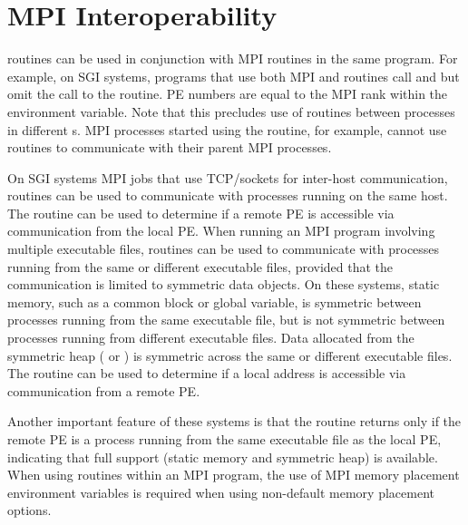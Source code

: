 \section{\ac{MPI} Interoperability}
\begin{sloppypar} %
\openshmem routines can be used in conjunction with \ac{MPI}
routines  in the same program.  For example, on SGI systems, programs that use both \ac{MPI} and \openshmem routines call  and  but omit the call to the  routine.  \openshmem \ac{PE} numbers are equal to the \ac{MPI} rank within the  environment variable.  Note that this precludes use of \openshmem routines between processes in different s. 
\ac{MPI} processes started using the  routine, for
example, cannot use \openshmem routines to communicate with their parent
\ac{MPI} processes.
\end{sloppypar}
On SGI systems \ac{MPI} jobs that use TCP/sockets for inter-host communication, \openshmem routines can be used to communicate with processes running on the same host.  The  routine can be used to determine if a remote \ac{PE} is accessible via \openshmem communication from the local \ac{PE}. When running an \ac{MPI} program involving multiple executable files, \openshmem routines can be used to communicate with processes running from the same or different executable files, provided that the communication is limited to symmetric data objects.  On these systems, static memory, such as a \Fortran{} common block or \Clang{} global variable, is symmetric between processes running from the same executable file, but is not symmetric between processes running from different executable files.  Data allocated from the symmetric heap ( or ) is symmetric across the same or different executable files. The routine  can be used to determine if a local address is accessible via \openshmem communication from a remote \ac{PE}.

 Another important feature of these systems is that the  routine returns  only if the remote \ac{PE} is a process running from the same executable file as the local PE, indicating that full \openshmem support (static memory and symmetric heap) is available.  When using \openshmem routines within an \ac{MPI} program, the use of \ac{MPI} memory placement environment variables is required when using non-default memory placement options.
